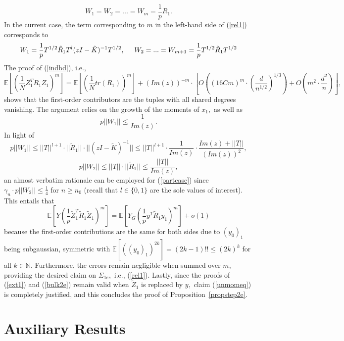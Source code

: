 \documentclass{article}
\numberwithin{equation}{section}
\begin{document}
\[W_1=W_2=...=W_m=\frac{1}{p}R_1.\] 
In the current case, the term corresponding to \(m\) in the left-hand side of (\ref{rel1}) corresponds to
\begin{equation}\label{partcase}
    W_1=\frac{1}{p}T^{1/2}\tilde{R}_1T^l(zI-\tilde{K})^{-1}T^{1/2},\hspace{0.5cm} W_2=...=W_{m+1}=\frac{1}{p}T^{1/2}\tilde{R}_1T^{1/2}
\end{equation}
The proof of (\ref{indbd}), i.e.,
\[\mathbb{E}[(\frac{1}{N}Z_1^TR_1Z_1)^m]=\mathbb{E}[(\frac{1}{N}tr(R_1))^m]+(Im(z))^{-m} \cdot [O((16Cm)^{m} \cdot (\frac{d}{n^{1/2}})^{1/3})+O(m^2 \cdot\frac{d^2}{n})],\]
shows that the first-order contributors are the tuples with all shared degrees vanishing. The argument relies on the growth of the moments of \(x_1,\) as well as 
\[p||W_1|| \leq \frac{1}{Im(z)}.\] 
In light of
\[p||W_1|| \leq ||T||^{l+1} \cdot ||\tilde{R}_1|| \cdot ||(zI-\tilde{K})^{-1}|| \leq ||T||^{l+1} \cdot \frac{1}{Im(z)} \cdot \frac{Im(z)+||T||}{(Im(z))^2},\]
\[p||W_2|| \leq ||T|| \cdot ||\tilde{R}_1|| \leq \frac{||T||}{Im(z)},\]
an almost verbatim rationale can be employed for (\ref{partcase}) since \(\gamma_n \cdot p||W_2|| \leq \frac{1}{4}\) for \(n \geq n_0\) (recall that \(l \in \{0,1\}\) are the sole values of interest). %
This entails that  
\[\mathbb{E}[Y(\frac{1}{p}\tilde{Z}_1^T\tilde{R}_1\tilde{Z}_1)^m]=\mathbb{E}[Y_G(\frac{1}{p}y^T\tilde{R}_1y_1)^m]+o(1)\]
because the first-order contributions are the same for both sides due to \((y_0)_1\) being subgaussian, symmetric with \(\mathbb{E}[((y_0)_1)^{2k}]=(2k-1)!! \leq (2k)^k\) for all \(k \in \mathbb{N}.\) %
Furthermore, the errors remain negligible when summed over \(m,\) providing the desired claim on \(\Sigma_{1e},\) i.e., (\ref{rel1}). Lastly, since the proofs of (\ref{ext1}) and (\ref{bulk2e}) remain valid when \(\tilde{Z}_1\) is replaced by \(y,\) claim (\ref{unmomeq}) is completely justified, and this concludes the proof of Proposition~\ref{propstep2e}.


\section{Auxiliary Results}\label{sectauxlemmas}
\end{document}
